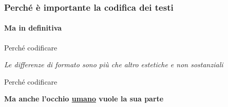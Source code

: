 \begin{frame}
    \frametitle{Perché è importante la codifica dei testi}
    \framesubtitle{Ma in definitiva}
    \addtocounter{nframe}{1}
    
    \begin{block}{Perché codificare}

        \begin{center}
            \textit{Le differenze di formato sono più che altro estetiche e non sostanziali}
        \end{center}

    \end{block}
     

    \begin{block}{Perché codificare}

        \begin{center}
            \textbf{Ma anche l'occhio \underline{umano} vuole la sua parte}
        \end{center}
       
    \end{block}

\end{frame}

